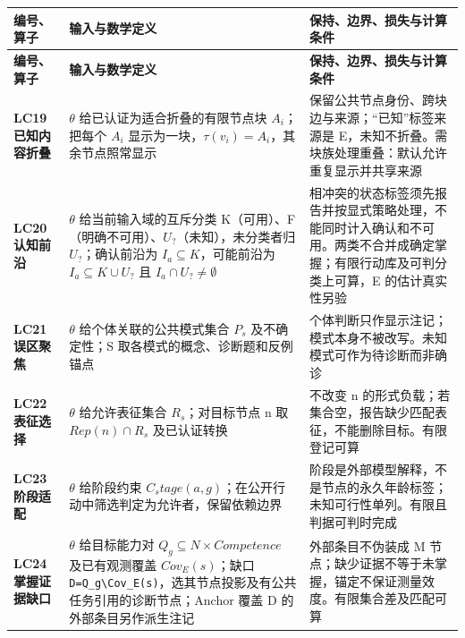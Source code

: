 \documentclass[UTF8,a4paper,zihao=-4,fontset=windows,openany]{ctexbook}
\def\mathrm#1{#1}%
\newcommand{\mcsbrk}{\penalty 200\relax}
\begin{document}
\begingroup\small\setlength{\tabcolsep}{4pt}
\begin{longtable}{>{\raggedright\arraybackslash}p{}>{\raggedright\arraybackslash}p{}>{\raggedright\arraybackslash}p{}}
\toprule
\textbf{编号、算子} & \textbf{输入与数学定义} & \textbf{保持、边界、损失与计算条件} \\
\midrule
\endfirsthead
\toprule
\textbf{编号、算子} & \textbf{输入与数学定义} & \textbf{保持、边界、损失与计算条件} \\
\midrule
\endhead
\bottomrule
\endfoot
\bottomrule
\endlastfoot
\textbf{LC19 已知内容折叠} & \(\theta\) 给已认证为适合折叠的有限节点块 \(A_i\)；把每个 \(A_i\) 显示为一块，\(\tau(v_i)=A_i\)，其余节点照常显示 & 保留公共节点身份、跨块边与来源；“已知”标签来源是 E，未知不折叠。需块族处理重叠：默认允许重复显示并共享来源 \\
\textbf{LC20 认知前沿} & \(\theta\) 给当前输入域的互斥分类 K（可用）、F（明确不可用）、\(U_?\)（未知），未分类者归 \(U_?\)；确认前沿为 \(I_a\subseteq K\)，可能前沿为 \(I_a\subseteq K\cup U_?\) 且 \(I_a\cap U_?\ne\emptyset\) & 相冲突的状态标签须先报告并按显式策略处理，不能同时计入确认和不可用。两类不合并成确定掌握；有限行动库及可判分类上可算，E 的估计真实性另验 \\
\textbf{LC21 误区聚焦} & \(\theta\) 给个体关联的公共模式集合 \(P_s\) 及不确定性；S 取各模式的概念、诊断题和反例锚点 & 个体判断只作显示注记；模式本身不被改写。未知模式可作为待诊断而非确诊 \\
\textbf{LC22 表征选择} & \(\theta\) 给允许表征集合 \(R_s\)；对目标节点 n 取 \(\mathrm{Rep}(n)\cap R_s\) 及已认证转换 & 不改变 n 的形式负载；若集合空，报告缺少匹配表征，不能删除目标。有限登记可算 \\
\textbf{LC23 阶段适配} & \(\theta\) 给阶段约束 \(C_\mathrm{stage}(a,g)\)；在公开行动中筛选判定为允许者，保留依赖边界 & 阶段是外部模型解释，不是节点的永久年龄标签；未知可行性单列。有限且判据可判时完成 \\
\textbf{LC24 掌握证据缺口} & \(\theta\) 给目标能力对 \(Q_g\subseteq N\times\mathrm{Competence}\) 及已有观测覆盖 \(\mathrm{Cov}_E(s)\)；缺口 \texttt{D=Q\mcsbrk\_g\textbackslash{}Cov\mcsbrk\_E(s)}，选其节点投影及有公共任务引用的诊断节点；Anchor 覆盖 D 的外部条目另作派生注记 & 外部条目不伪装成 M 节点；缺少证据不等于未掌握，锚定不保证测量效度。有限集合差及匹配可算 \\
\end{longtable}
\endgroup
\end{document}
